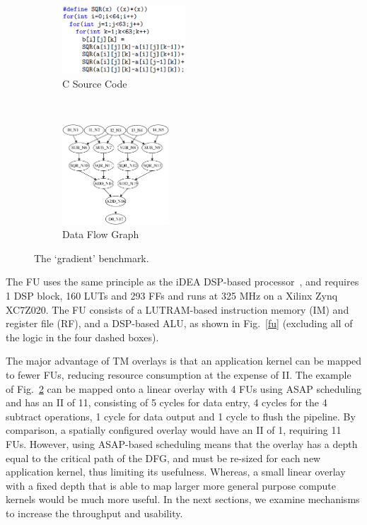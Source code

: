 \begin{figure}[t]
	\centering
	\begin{subfigure}[t]{0.2\textwidth}
		\centering
		\includegraphics[width=4.6cm]{figures/code.png}
		\caption{C Source Code}
		\label{code}
	\end{subfigure}
	~~
	\begin{subfigure}[t]{0.24\textwidth}
		\centering
		\includegraphics[width=4cm]{figures/DFG.pdf}
		\caption{Data Flow Graph}
		\label{dfg}
	\end{subfigure}
	\caption{The `gradient' benchmark.}
	\label{dfgs}
\end{figure} 


The FU uses the same principle as the iDEA DSP-based processor~\cite{cheah2014idea}, and requires 1 DSP block, 160 LUTs and 293 FFs and runs at 325 MHz on a Xilinx Zynq XC7Z020.
The FU consists of a LUTRAM-based instruction memory (IM) and register file (RF), and a DSP-based ALU, as shown in Fig.~\ref{fu} (excluding all of the logic in the four dashed boxes). 

The major advantage of TM overlays is that an application kernel can be mapped to fewer FUs, reducing resource consumption at the expense of II. The example of Fig.~\ref{dfg} can be mapped onto a linear overlay with 4 FUs using ASAP scheduling and has an II of 11, consisting of 5 cycles for data entry, 4 cycles for the 4 subtract operations, 1 cycle for data output and 1 cycle to flush the pipeline.
By comparison, a spatially configured overlay would have an II of 1, requiring 11 FUs.
However, using ASAP-based scheduling means that the overlay has a depth equal to the critical path of the DFG, and must be re-sized for each new application kernel, thus limiting its usefulness. 
Whereas,  a small linear overlay with a fixed depth that is able to map larger more general purpose compute kernels would be much more useful.
In the next sections, we examine mechanisms to increase the throughput and usability.


